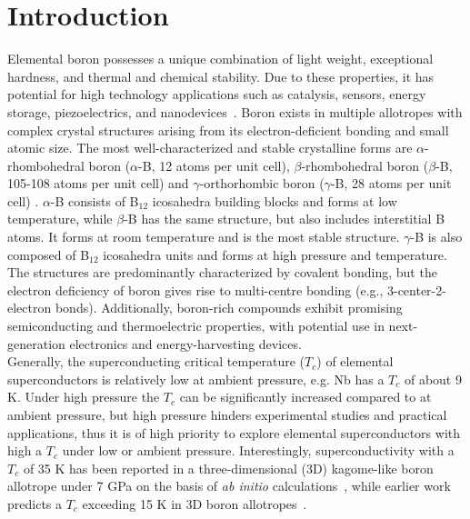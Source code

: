 \documentclass[aps,prb,preprint,notitlepage]{revtex4-2}
\begin{document}
\section{Introduction} Elemental boron possesses a unique combination of light weight, exceptional hardness, and thermal and chemical stability. 
Due to these properties, it has potential for 
high technology applications such as catalysis, sensors, energy storage, 
piezoelectrics, and nanodevices~\cite{ranjan2024properties}.
Boron exists in multiple allotropes with complex crystal structures arising from its electron-deficient bonding and small atomic size. The most well-characterized and stable crystalline forms are $\alpha$-rhombohedral boron ($\alpha$-B, 12 atoms per unit cell), $\beta$-rhombohedral boron ($\beta$-B, 105-108 atoms per unit cell) \cite{widom2008symmetry}  and $\gamma$-orthorhombic boron ($\gamma$-B, 28 atoms per unit cell) \cite{an2016new}. $\alpha$-B consists of B$_{12}$ icosahedra building blocks and forms 
at low temperature, while $\beta$-B has the same structure, but also includes
interstitial B atoms. It forms at room temperature and is the most stable structure.  $\gamma$-B is also composed of B$_{12}$ icosahedra units and forms at high pressure and 
temperature. 
The structures are predominantly characterized by covalent bonding, 
but the electron deficiency of boron gives rise to multi-centre bonding (e.g., 
3-center-2-electron bonds). 
Additionally, boron-rich compounds exhibit promising 
semiconducting and thermoelectric properties, with 
potential use in next-generation electronics and energy-harvesting devices.
\\
Generally, the superconducting critical temperature ($T_c$) of elemental superconductors is relatively low at ambient pressure, e.g. Nb has a $T_c$ of 
about 9 K. Under high pressure the $T_c$ can be significantly increased compared to at ambient pressure, but high pressure hinders experimental studies and practical applications, thus it is of high priority to explore elemental 
superconductors with high a $T_c$ under low or ambient pressure.
Interestingly,  superconductivity with a $T_c$ of 35 K has been reported 
in a three-dimensional (3D) kagome-like boron allotrope under 7 
GPa on the basis of {\em ab initio} 
calculations~\cite{ouyang2025superconductivity}, while earlier work predicts
a $T_c$ exceeding 15 K in 3D  boron allotropes~\cite{zhang2020superconducting}.
\end{document}
